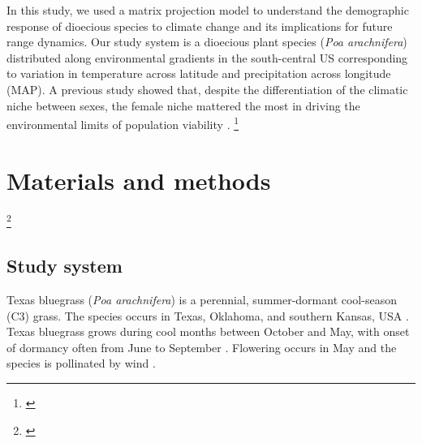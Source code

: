 \documentclass[11pt]{article}
\newcommand{\tom}[2]{{\color{red}{#1}}\footnote{\textit{\color{red}{#2}}}}
\begin{document}
In this study, we used a matrix projection model to understand the demographic response of dioecious species to climate change and its implications for future range dynamics.
Our study system is a dioecious plant species (\textit{Poa arachnifera}) distributed along environmental gradients in the south-central US corresponding to variation in temperature across latitude and precipitation across longitude (MAP). 
A previous study showed that, despite the differentiation of the climatic niche between sexes, the female niche mattered the most in driving the environmental limits of population viability \citep{miller2022two}. 
\tom{Thus, under current climate conditions, we hypothesized that high temperature and lower precipitation during the growing season have negative effects on population growth rate through a reduction in female growth, survival, and fecundity rate. 
However, that reduction in population growth rate will not go below a viable population (population growth rate less than one) even at range edge. 
Future climate will exacerbate the effect of temperature and precipitation on female vital rates and drive population to extinction, particularly at range edge.}{These hypoheses / predictions are hard to follow. I think it would be helpful to identify 2-3 main questions that this study aims to address and describe these here at the end of the Intro. We could brainstorm these together. }


\section*{Materials and methods}
\tom{}{General comment: the methods section needs better organization and clearer structure. It also needs better motivation, the **why** behind these methods. Strengthening and focusing the end of the Introduction will help.}

\subsection*{Study system}
Texas bluegrass (\textit{Poa arachnifera}) is a perennial, summer-dormant cool-season (C3) grass. 
The species occurs in Texas, Oklahoma, and southern Kansas, USA \citep{hitchcock1971manual}. 
Texas bluegrass grows during cool months between October and May, with onset of dormancy often from June to September \citep{kindiger2004interspecific}.
Flowering occurs in May and the species is pollinated by wind \citep{hitchcock1971manual}.
\end{document}
